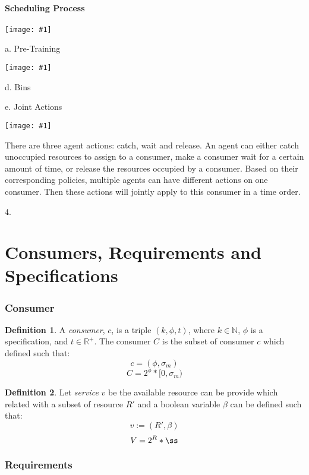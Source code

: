 \documentclass{article}
\theoremstyle{definition}
\newtheorem{definition}{Definition}[section]
\theoremstyle{remark}
\newcommand{\addpic}[1]{\texttt{[image: \#1]}}
\begin{document}
	
	\subsection{Scheduling Process}
	
	
	\addpic{./figures/Training2.jpg}
	
	
	a. Pre-Training
	
	\addpic{./figures/Pre-Train.jpg}

	
	
	
	d. Bins
	
	e. Joint Actions
	
	\addpic{./figures/Joint-action.jpg}
	
	There are three agent actions: catch, wait and release. An agent can either catch unoccupied resources to assign to a consumer, make a consumer wait for a certain amount of time, or release the resources occupied by a consumer. Based on their corresponding policies, multiple agents can have different actions on one consumer. Then these actions will jointly apply to this consumer in a time order.
		
	4.
	
	\newpage
	
	\part{Consumers, Requirements and Specifications}
	
	\section{Consumer}
	
		\begin{definition}
			A \emph{consumer}, $c$, is a triple $(k, \phi, t)$, where $k \in \mathbb{N}$, $\phi$ is a specification, and $t \in \mathbb{R}^{+}$. The consumer $C$ is the subset of consumer $c$ which defined such that:
			\[
			c = (\phi , \sigma_m)
			\]
			\[
			C = 2^{\phi}*[0,\sigma_m)
			\]
		\end{definition}
		
		\begin{definition}
			Let \emph{service} $v$ be the available resource can be provide which related with a subset of resource $R'$ and a boolean variable $\beta$ can be defined such that:
			\[
			v := (R', \beta)
			\]
			\[
			V = 2^{R}*{\ss}
			\]
		\end{definition}
	
	\section{Requirements}
	
\end{document}

